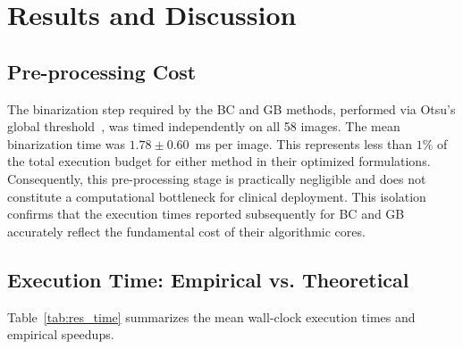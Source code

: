\section{Results and Discussion}
\label{sec:results}

\subsection{Pre-processing Cost}
\label{subsec:preproc}

The binarization step required by the BC and GB methods, performed via Otsu's global threshold~\cite{Otsu1979}, was timed independently on all 58 images. The mean binarization time was $1.78 \pm 0.60$~ms per image. This represents less than $1\%$ of the total execution budget for either method in their optimized formulations. Consequently, this pre-processing stage is practically negligible and does not constitute a computational bottleneck for clinical deployment. This isolation confirms that the execution times reported subsequently for BC and GB accurately reflect the fundamental cost of their algorithmic cores.

\subsection{Execution Time: Empirical vs. Theoretical}
\label{subsec:res_time}

Table~\ref{tab:res_time} summarizes the mean wall-clock execution times and empirical speedups.

\begin{table}[h]
\centering
\caption{Mean wall-clock execution time per image. Speedup $= \bar{t}_{\text{naive}} / \bar{t}_{\text{opt}}$.}
\label{tab:res_time}
\end{table}

